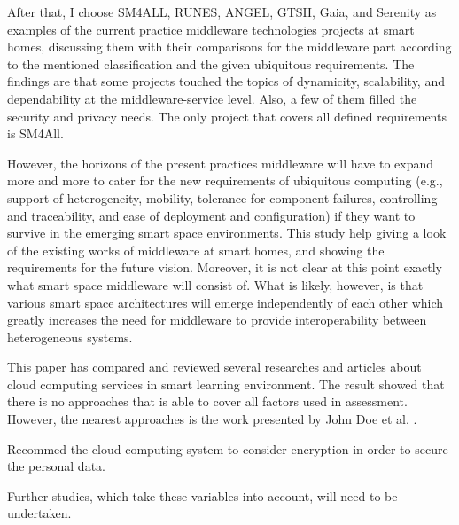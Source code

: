 \documentclass[journal]{vgtc}                %
\begin{document}
After that, I choose SM4ALL, RUNES, ANGEL, GTSH, Gaia, and Serenity as examples of the current practice middleware technologies projects at smart homes, discussing them with their comparisons for the middleware part according to the mentioned classification and the given ubiquitous requirements. The findings are that some projects touched the topics of dynamicity, scalability, and dependability at the middleware-service level. Also, a few of them filled the security and privacy needs. The only project that covers all defined requirements is SM4All.

However, the horizons of the present practices middleware will have to expand more and more to cater for the new requirements of ubiquitous computing (e.g., support of heterogeneity, mobility, tolerance for component failures, controlling and traceability, and ease of deployment and configuration) if they want to survive in the emerging smart space environments. This study help giving a look of the existing works of middleware at smart homes, and showing the requirements for the future vision. Moreover, it is not clear at this point exactly what smart space middleware will consist of. What is likely, however, is that various smart space architectures will emerge independently of each other which greatly increases the need for middleware to provide interoperability between heterogeneous systems.

This paper has compared and reviewed several researches and articles about cloud computing services in smart learning environment. The result showed that there is no approaches that is able to cover all factors used in assessment. However, the nearest approaches is the work presented by John Doe et al. \cite{}.

Recommed the cloud computing system to consider encryption in order to secure the personal data.

Further studies, which take these variables into account, will need to be undertaken.




\end{document}
